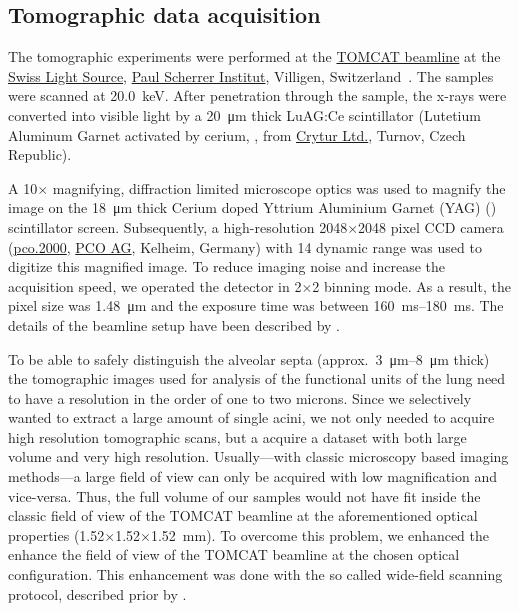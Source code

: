 \documentclass[%
	draft=true,
	paper=a4,%
	twoside=true,%
	abstract=true]{scrartcl}
\newcommand{\todojcs}[2][]{\todo[color=magenta!62!white, #1]{Johannes: #2}}
\begin{document}
\subsection{Tomographic data acquisition}\label{sec:tomcat}
The tomographic experiments were performed at the \href{http://www.psi.ch/sls/tomcat/}{TOMCAT beamline} at the \href{http://www.psi.ch/sls/}{Swiss Light Source}, \href{http://www.psi.ch/}{Paul Scherrer Institut}, Villigen, Switzerland~\cite{Stampanoni2006a}. The samples were scanned at \SI{20.0}{\kilo\electronvolt}. After penetration through the sample, the x-rays were converted into visible light by a \SI{20}{\micro\meter} thick LuAG:Ce scintillator (Lutetium Aluminum Garnet activated by cerium, , from \href{http://www.crytur.cz/}{Crytur Ltd.}, Turnov, Czech Republic).

A 10\(\times\) magnifying, diffraction limited microscope optics was used to magnify the image on the \SI{18}{\micro\meter} thick Cerium doped Yttrium Aluminium Garnet (YAG) () scintillator screen. Subsequently, a high-resolution 2048\(\times\)2048 pixel CCD camera (\href{http://www.pco.de/sensitive-cameras/pco2000/}{pco.2000}, \href{http://www.pco.de/}{PCO AG}, Kelheim, Germany) with \SI{14}{\bit} dynamic range was used to digitize this magnified image. To reduce imaging noise and increase the acquisition speed, we operated the detector in 2\(\times\)2 binning mode. As a result, the pixel size was \SI{1.48}{\micro\meter} and the exposure time was between \SIrange{160}{180}{\milli\second}. The details of the beamline setup have been described by \citet{Stampanoni2006a}.

To be able to safely distinguish the alveolar septa (approx.~\SIrange{3}{8}{\micro\meter} thick\todojcs{Correct?}) the tomographic images used for analysis of the functional units of the lung need to have a resolution in the order of one to two microns. Since we selectively wanted to extract a large amount of single acini, we not only needed to acquire high resolution tomographic scans, but a acquire a dataset with both large volume and very high resolution. Usually---with classic microscopy based imaging methods---a large field of view can only be acquired with low magnification and vice-versa. Thus, the full volume of our samples would not have fit inside the classic field of view of the TOMCAT beamline at the aforementioned optical properties (1.52\(\times\)1.52\(\times\)\SI{1.52}{\milli\meter}). To overcome this problem, we enhanced the enhance the field of view of the TOMCAT beamline at the chosen optical configuration. This enhancement was done with the so called wide-field scanning protocol, described prior by \citet{Haberthuer2010}.
\end{document}
